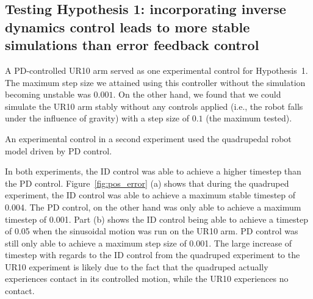 \documentclass[conference]{IEEEtran}
\begin{document}
\subsection{Testing Hypothesis 1: incorporating inverse dynamics control leads to more stable simulations than error feedback control}

A PD-controlled UR10 arm served as one experimental control for Hypothesis~1. The maximum step size we attained using this controller without the simulation becoming unstable was $0.001$. On the other hand, we found that we could simulate the UR10 arm stably without any controls applied (i.e., the robot falls under the influence of gravity) with a step size of $0.1$ (the maximum tested).

An experimental control in a second experiment used the quadrupedal robot model driven by PD control. 


In both experiments, the ID control was able to achieve a higher timestep than the PD control. Figure~\ref{fig:pos_error} (a) shows that during the quadruped experiment, the ID control was able to achieve a maximum stable timestep of 0.004. The PD control, on the other hand was only able to achieve a maximum timestep of 0.001. Part (b) shows the ID control being able to achieve a timestep of 0.05 when the sinusoidal motion was run on the UR10 arm.  PD control was still only able to achieve a maximum step size of 0.001.  The large increase of timestep with regards to the ID control from the quadruped experiment to the UR10 experiment is likely due to the fact that the quadruped actually experiences contact in its controlled motion, while the UR10 experiences no contact.
\end{document}
